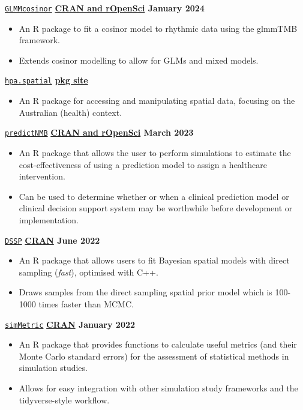 \texttt{\href{https://github.com/ropensci/GLMMcosinor}{GLMMcosinor}} \hfill \textbf{\href{https://docs.ropensci.org/GLMMcosinor}{CRAN and rOpenSci} January 2024} \par
\begin{itemize}
    \item An R package to fit a cosinor model to rhythmic data using the glmmTMB framework. 
    \item Extends cosinor modelling to allow for GLMs and mixed models.
\end{itemize}

\texttt{\href{https://github.com/healthpolicyanalysis/hpa.spatial}{hpa.spatial}} \hfill \textbf{\href{https://healthpolicyanalysis.github.io/hpa.spatial/}{pkg site}} \par
\begin{itemize}
    \item An R package for accessing and manipulating spatial data, focusing on the Australian (health) context.
\end{itemize}

\texttt{\href{https://github.com/ropensci/predictNMB}{predictNMB}} \hfill \textbf{\href{https://docs.ropensci.org/predictNMB/}{CRAN and rOpenSci} March 2023} \par
\begin{itemize}
    \item An R package that allows the user to perform simulations to estimate the cost-effectiveness of using a prediction model to assign a healthcare intervention.
    \item Can be used to determine whether or when a clinical prediction model or clinical decision support system may be worthwhile before development or implementation.
\end{itemize}

\texttt{\href{https://github.com/gentrywhite/DSSP}{DSSP}} \hfill \textbf{\href{https://cran.r-project.org/package=DSSP}{CRAN} June 2022} \par
\begin{itemize}
    \item An R package that allows users to fit Bayesian spatial models with direct sampling (\textit{fast}), optimised with C++.
    \item Draws samples from the direct sampling spatial prior model which is 100-1000 times faster than MCMC.
\end{itemize}

\texttt{\href{https://github.com/RWParsons/simMetric}{simMetric}} \hfill \textbf{\href{https://cran.r-project.org/package=simMetric}{CRAN}  January 2022} \par
\begin{itemize}
    \item An R package that provides functions to calculate useful metrics (and their Monte Carlo standard errors) for the assessment of statistical methods in simulation studies.
    \item Allows for easy integration with other simulation study frameworks and the tidyverse-style workflow.
\end{itemize}

